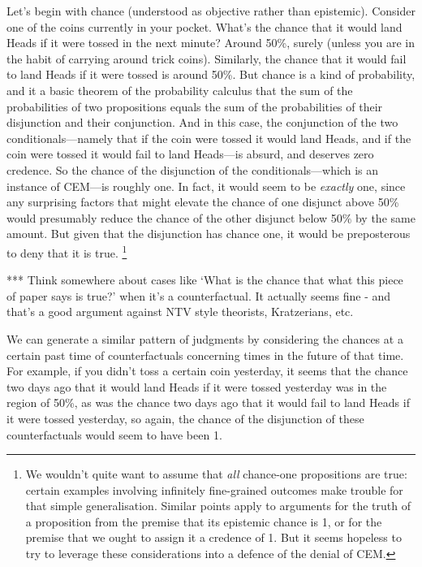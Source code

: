 \documentclass[If.tex]{subfiles}
\begin{document}
Let's begin with chance (understood as objective rather than epistemic). Consider one of the coins currently in your pocket. What's the chance that it would land Heads if it were tossed in the next minute? Around 50\%, surely (unless you are in the habit of carrying around trick coins). Similarly, the chance that it would fail to land Heads if it were tossed is around 50\%. But chance is a kind of probability, and it a basic theorem of the probability calculus that the sum of the probabilities of two propositions equals the sum of the probabilities of their disjunction and their conjunction. And in this case, the conjunction of the two conditionals---namely that if the coin were tossed it would land Heads, and if the coin were tossed it would fail to land Heads---is absurd, and deserves zero credence. So the chance of the disjunction of the conditionals---which is an instance of CEM---is roughly one. In fact, it would seem to be \emph{exactly} one, since any surprising factors that might elevate the chance of one disjunct above 50\% would presumably reduce the chance of the other disjunct below 50\% by the same amount. But given that the disjunction has chance one, it would be preposterous to deny that it is true.%
\footnote{We wouldn't quite want to assume that \emph{all} chance-one propositions are true: certain examples involving infinitely fine-grained outcomes make trouble for that simple generalisation. Similar points apply to arguments for the truth of a proposition from the premise that its epistemic chance is 1, or for the premise that we ought to assign it a credence of 1. But it seems hopeless to try to leverage these considerations into a defence of the denial of CEM.}

*** Think somewhere about cases like ‘What is the chance that what this piece of paper says is true?’ when it's a counterfactual.  It actually seems fine - and that's a good argument against NTV style theorists, Kratzerians, etc.  

We can generate a similar pattern of judgments by considering the chances at a certain past time of counterfactuals concerning times in the future of that time. For example, if you didn't toss a certain coin yesterday, it seems that the chance two days ago that it would land Heads if it were tossed yesterday was in the region of 50\%, as was the chance two days ago that it would fail to land Heads if it were tossed yesterday, so again, the chance of the disjunction of these counterfactuals would seem to have been 1.
\end{document}
